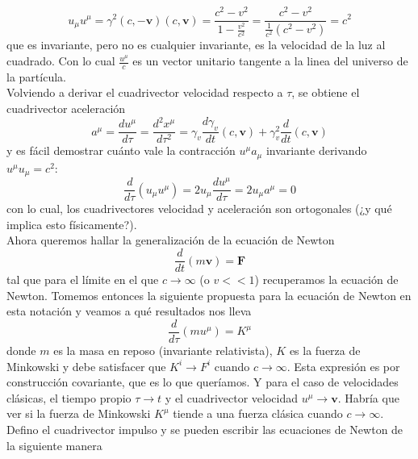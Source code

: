 \begin{equation*}
    u_{\mu}u^{\mu} = 
    \gamma^{2}(c,-\textbf{v})(c, \textbf{v}) =
    \frac{c^{2}-v^{2}}{1 - \frac{v^{2}}{c^{2}}} =
    \frac{c^{2}-v^{2}}{\frac{1}{c^{2}}(c^{2}-v^{2})} = 
    c^{2}
\end{equation*}
que es invariante, pero no es cualquier invariante, es la velocidad de la luz al cuadrado. Con lo cual $\frac{u^{\mu}}{c}$ es un vector unitario tangente a la linea del universo de la partícula.\\
\indent Volviendo a derivar el cuadrivector velocidad respecto a $\tau$, se obtiene el cuadrivector aceleración
\begin{equation*}
    a^{\mu} 
    = \frac{du^{\mu}}{d\tau} 
    = \frac{d^{2}x^{\mu}}{d\tau^{2}}
    = \gamma_{v}\frac{d\gamma_{v}}{dt}(c, \textbf{v}) 
    + \gamma_{v}^{2} \frac{d}{dt}(c, \textbf{v})
\end{equation*}
y es fácil demostrar cuánto vale la contracción $u^{\mu}a_{\mu}$ invariante derivando $u^{\mu}u_{\mu} = c^{2}$:
\begin{equation*}
    \frac{d}{d\tau} (u_{\mu}u^{\mu}) 
    = 2 u_{\mu}\frac{du^{\mu}}{d\tau} 
    = 2 u_{\mu}a^{\mu} = 0
\end{equation*}
con lo cual, los cuadrivectores velocidad y aceleración son ortogonales (¿y qué implica esto físicamente?).\\
\indent Ahora queremos hallar la generalización de la ecuación de Newton
\begin{equation*}
    \frac{d}{dt}(m\textbf{v}) = \textbf{F}
\end{equation*}
tal que para el límite en el que $c \to \infty$ (o $v << 1$) recuperamos la ecuación de Newton. Tomemos entonces la siguiente propuesta para la ecuación de Newton en esta notación y veamos a qué resultados nos lleva
\begin{equation*}
    \frac{d}{d\tau} (m u^{\mu}) = K^{\mu}
\end{equation*}
donde $m$ es la masa en reposo (invariante relativista), $K$ es la fuerza de Minkowski y debe satisfacer que $K^{i} \to F^{i}$ cuando $c \to \infty$. Esta expresión es por construcción covariante, que es lo que queríamos. Y para el caso de velocidades clásicas, el tiempo propio $\tau \to t$ y el cuadrivector velocidad $u^{\mu}\to \textbf{v}$. Habría que ver si la fuerza de Minkowski $K^{\mu}$ tiende a una fuerza clásica cuando $c\to \infty$.\\
\indent Defino el cuadrivector impulso y se pueden escribir las ecuaciones de Newton de la siguiente manera
